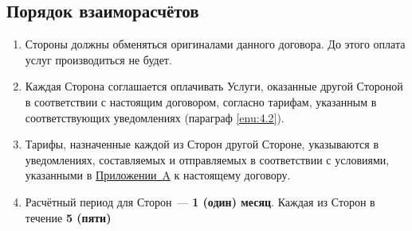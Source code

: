 \begin{Form}
    \section{Порядок взаиморасчётов}
      \begin{enumerate}[label=\thesection.\arabic*.]
       \item  Стороны  должны обменяться оригиналами данного договора. До этого оплата услуг производиться не будет.      
       \item Каждая Сторона  соглашается оплачивать Услуги, оказанные другой Стороной в соответствии с
             настоящим договором, согласно тарифам, указанным в соответствующих уведомлениях (параграф \ref{enu:4.2}).
       \item Тарифы, назначенные каждой из Сторон другой Стороне, указываются в уведомлениях,
             составляемых и отправляемых в соответствии с условиями, указанными в \hyperref[anx:a-ru]{\flqq{}Приложении~A\frqq{}}
             к настоящему договору.\label{enu:4.2}
     \item Расчётный период для Сторон~--- \textbf{1 (один) месяц}. Каждая из Сторон  в течение \textbf{5 (пяти)
}
\end{enumerate}
\end{Form}
